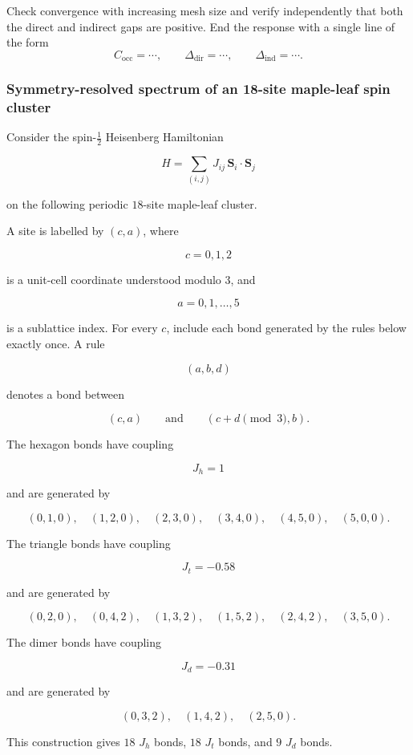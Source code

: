 Check convergence with increasing mesh size and verify independently
that both the direct and indirect gaps are positive. End the response
with a single line of the form
\[
\boxed{
C_{\mathrm{occ}}=\cdots,
\qquad
\Delta_{\mathrm{dir}}=\cdots,
\qquad
\Delta_{\mathrm{ind}}=\cdots
}.
\]

\subsubsection{Symmetry-resolved spectrum of an 18-site maple-leaf spin cluster}
\label{problem:maple-leaf-exact-diagonalization}
Consider the spin-\(\tfrac{1}{2}\) Heisenberg Hamiltonian

$$
H=\sum_{(i,j)} J_{ij}\,\mathbf{S}_i\cdot\mathbf{S}_j
$$

on the following periodic \(18\)-site maple-leaf cluster.

A site is labelled by \((c,a)\), where

$$
c=0,1,2
$$

is a unit-cell coordinate understood modulo \(3\), and

$$
a=0,1,\ldots,5
$$

is a sublattice index. For every \(c\), include each bond generated by the rules below exactly once. A rule

$$
(a,b,d)
$$

denotes a bond between

$$
(c,a)
\qquad\text{and}\qquad
(c+d\!\!\!\pmod{3},b).
$$

The hexagon bonds have coupling

$$
J_h=1
$$

and are generated by

$$
(0,1,0),\quad
(1,2,0),\quad
(2,3,0),\quad
(3,4,0),\quad
(4,5,0),\quad
(5,0,0).
$$

The triangle bonds have coupling

$$
J_t=-0.58
$$

and are generated by

$$
(0,2,0),\quad
(0,4,2),\quad
(1,3,2),\quad
(1,5,2),\quad
(2,4,2),\quad
(3,5,0).
$$

The dimer bonds have coupling

$$
J_d=-0.31
$$

and are generated by

$$
(0,3,2),\quad
(1,4,2),\quad
(2,5,0).
$$

This construction gives \(18\) \(J_h\) bonds, \(18\) \(J_t\) bonds, and
\(9\) \(J_d\) bonds.

